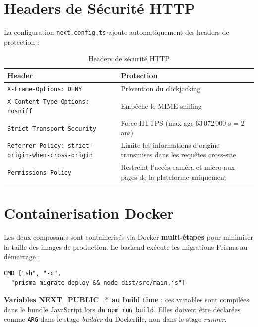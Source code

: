 ﻿\documentclass[12pt,a4paper]{report}
\begin{document}
\section{Headers de Sécurité HTTP}

La configuration \texttt{next.config.ts} ajoute automatiquement des headers de protection :

\begin{table}[H]
\centering
\begin{tabularx}{\textwidth}{lX}
\toprule
\textbf{Header} & \textbf{Protection} \\
\midrule
\texttt{X-Frame-Options: DENY} & Prévention du clickjacking \\
\texttt{X-Content-Type-Options: nosniff} & Empêche le MIME sniffing \\
\texttt{Strict-Transport-Security} & Force HTTPS (max-age 63\,072\,000 s = 2 ans) \\
\texttt{Referrer-Policy: strict-origin-when-cross-origin} & Limite les informations d'origine transmises dans les requêtes cross-site \\
\texttt{Permissions-Policy} & Restreint l'accès caméra et micro aux pages de la plateforme uniquement \\
\bottomrule
\end{tabularx}
\caption{Headers de sécurité HTTP}
\end{table}

\section{Containerisation Docker}

Les deux composants sont containerisés via Docker \textbf{multi-étapes} pour minimiser la taille des images de production. Le backend exécute les migrations Prisma au démarrage :

\begin{lstlisting}[style=bash, caption={CMD du backend en production}]
CMD ["sh", "-c",
  "prisma migrate deploy && node dist/src/main.js"]
\end{lstlisting}

\begin{infobox}
\noindent\textbf{Variables NEXT\_PUBLIC\_* au build time} : ces variables sont compilées dans le bundle JavaScript lors du \texttt{npm run build}. Elles doivent être déclarées comme \texttt{ARG} dans le stage \textit{builder} du Dockerfile, non dans le stage \textit{runner}.
\end{infobox}
\end{document}
